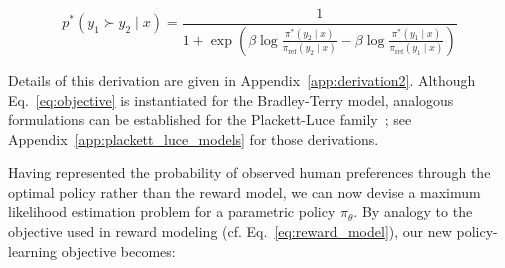 \begin{equation}\label{eq:objective}
    p^*(y_1\succ y_2 \mid x)=\frac{1}{1 + \exp\left(\beta \log \frac{\pi^*(y_2\mid x)}{\pi_\text{ref}(y_2\mid x)} - \beta \log \frac{\pi^*(y_1\mid x)}{\pi_\text{ref}(y_1\mid x)}\right)}
\end{equation}

Details of this derivation are given in Appendix~\ref{app:derivation2}. Although Eq.~\ref{eq:objective} is instantiated for the Bradley-Terry model, analogous formulations can be established for the Plackett-Luce family~\citep{plackett1975analysis, luce2012individual}; see Appendix~\ref{app:plackett_luce_models} for those derivations.

Having represented the probability of observed human preferences through the optimal policy rather than the reward model, we can now devise a maximum likelihood estimation problem for a parametric policy $\pi_\theta$. By analogy to the objective used in reward modeling (cf. Eq.~\ref{eq:reward_model}), our new policy-learning objective becomes:

